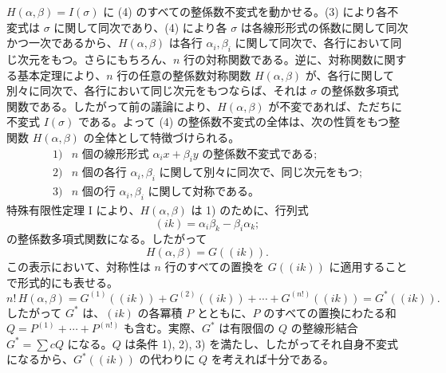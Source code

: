 \(H(\alpha,\beta)=I(\sigma)\) に (4) のすべての整係数不変式を動かせる。(3) により各不変式は \(\sigma\) に関して同次であり、(4) により各 \(\sigma\) は各線形形式の係数に関して同次かつ一次であるから、\(H(\alpha,\beta)\) は各行 \(\alpha_i,\beta_i\) に関して同次で、各行において同じ次元をもつ。さらにもちろん、\(n\) 行の対称関数である。逆に、対称関数に関する基本定理により、\(n\) 行の任意の整係数対称関数 \(H(\alpha,\beta)\) が、各行に関して別々に同次で、各行において同じ次元をもつならば、それは \(\sigma\) の整係数多項式関数である。したがって前の議論により、\(H(\alpha,\beta)\) が不変であれば、ただちに不変式 \(I(\sigma)\) である。よって (4) の整係数不変式の全体は、次の性質をもつ整関数 \(H(\alpha,\beta)\) の全体として特徴づけられる。
\[
\begin{array}{ll}
1) & \text{\(n\) 個の線形形式 \(\alpha_i x+\beta_i y\) の整係数不変式である;}\\
2) & \text{\(n\) 個の各行 \(\alpha_i,\beta_i\) に関して別々に同次で、同じ次元をもつ;}\\
3) & \text{\(n\) 個の行 \(\alpha_i,\beta_i\) に関して対称である。}
\end{array}
\]
特殊有限性定理 I により、\(H(\alpha,\beta)\) は 1) のために、行列式
\[
        (ik)=\alpha_i\beta_k-\beta_i\alpha_k;
\]
の整係数多項式関数になる。したがって
\[
        H(\alpha,\beta)=G((ik)).
\]
この表示において、対称性は \(n\) 行のすべての置換を \(G((ik))\) に適用することで形式的にも表せる。
\begin{equation}
        n!\,H(\alpha,\beta)
        =
        G^{(1)}((ik))+G^{(2)}((ik))+\cdots+G^{(n!)}((ik))
        =G^*((ik)).
\end{equation}
したがって \(G^*\) は、\((ik)\) の各冪積 \(P\) とともに、\(P\) のすべての置換にわたる和 \(Q=P^{(1)}+\cdots+P^{(n!)}\) も含む。実際、\(G^*\) は有限個の \(Q\) の整線形結合 \(G^*=\sum cQ\) になる。\(Q\) は条件 1), 2), 3) を満たし、したがってそれ自身不変式になるから、\(G^*((ik))\) の代わりに \(Q\) を考えれば十分である。

